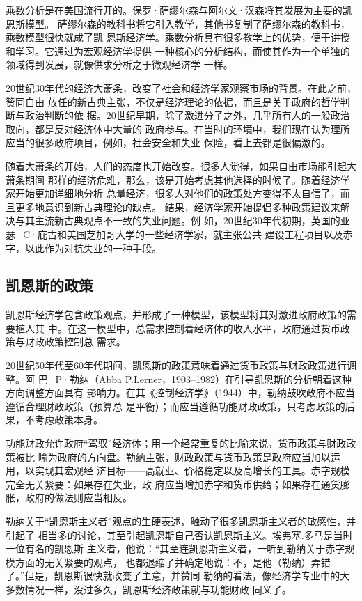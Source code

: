 乘数分析是在美国流行开的。保罗·萨缪尔森与阿尔文·汉森将其发展为主要的凯恩斯模型。
萨缪尔森的教科书将它引入教学，其他书复制了萨缪尔森的教科书，乘数模型很快就成了凯
恩斯经济学。乘数分析具有很多教学上的优势，便于讲授和学习。它通过为宏观经济学提供
一种核心的分析结构，而使其作为一个单独的领域得到发展，就像供求分析之于微观经济学
一样。

20世纪30年代的经济大萧条，改变了社会和经济学家观察市场的背景。在此之前，赞同自由
放任的新古典主张，不仅是经济理论的依据，而且是关于政府的哲学判断与政治判断的依
据。20世纪早期，除了激进分子之外，几乎所有人的一般政治取向，都是反对经济体中大量的
政府参与。在当时的环境中，我们现在认为理所应当的很多政府项目，例如，社会安全和失业
保险，看上去都是很偏激的。

随着大萧条的开始，人们的态度也开始改变。很多人觉得，如果自由市场能引起大萧条期间
那样的经济危难，那么，该是开始考虑其他选择的时候了。随着经济学家开始更加详细地分析
总量经济，很多人对他们的政策处方变得不太自信了，而且更多地意识到新古典理论的缺点。
结果，经济学家开始提倡多种政策建议来解决与其主流新古典观点不一致的失业问题。例
如，20世纪30年代初期，英国的亚瑟·C·庇古和美国芝加哥大学的一些经济学家，就主张公共
建设工程项目以及赤字，以此作为对抗失业的一种手段。

\subsection{凯恩斯的政策}

凯恩斯经济学包含政策观点，并形成了一种模型，该模型将其对激进政府政策的需要植人其
中。在这一模型中，总需求控制着经济体的收入水平，政府通过货币政策与财政政策控制总
需求。

20世纪50年代至60年代期间，凯恩斯的政策意味着通过货币政策与财政政策进行调整。阿
巴·P·勒纳（Abba P.Lerner，1903--1982）在引导凯恩斯的分析朝着这种方向调整方面具有
影响力。在其《控制经济学》（1944）中，勒纳鼓吹政府不应当遵循合理财政政策（预算总
是平衡）；而应当遵循功能财政政策，只考虑政策的后果，不考虑政策本身。

功能财政允许政府“驾驭”经济体；用一个经常重复的比喻来说，货币政策与财政政策被比
喻为政府的方向盘。勒纳主张，财政政策与货币政策是政府应当加以运用，以实现其宏观经
济目标——高就业、价格稳定以及高增长的工具。赤字规模完全无关紧要：如果存在失业，政
府应当增加赤字和货币供给；如果存在通货膨胀，政府的做法则应当相反。

勒纳关于“凯恩斯主义者”观点的生硬表述，触动了很多凯恩斯主义者的敏感性，并引起了
相当多的讨论，其至引起凯恩斯自己否认凯恩斯主义。埃弗塞.多马是当时一位有名的凯恩斯
主义者，他说：“其至连凯恩斯主义者，一听到勒纳关于赤字规模方面的无关紧要的观点，
也都退缩了并确定地说：不，是他（勒纳）弄错了。”但是，凯恩斯很快就改变了主意，并赞同
勒纳的看法，像经济学专业中的大多数情况一样，没过多久，凯恩斯经济政策就与功能财政
同义了。

